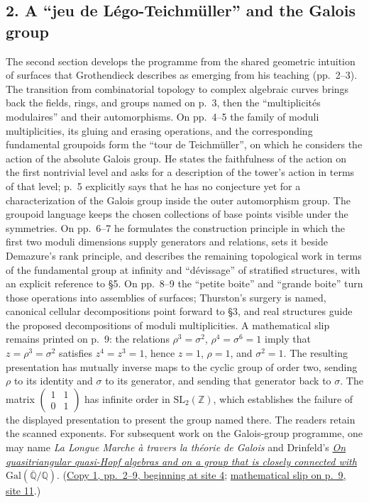 \documentclass[11pt,a4paper]{article}
\begin{document}
\subsection*{2. A ``jeu de Légo-Teichmüller'' and the Galois group}
The second section develops the programme from the shared geometric
intuition of surfaces that Grothendieck describes as emerging from his
teaching (pp.~2--3). The transition from combinatorial topology to complex
algebraic curves brings back the fields, rings, and groups named on p.~3,
then the ``multiplicités modulaires'' and their automorphisms. On
pp.~4--5 the family of moduli multiplicities, its gluing and erasing
operations, and the corresponding fundamental groupoids form the
``tour de Teichmüller'', on which he considers the action of the absolute
Galois group. He states the faithfulness of the action on the first
nontrivial level and asks for a description of the tower's action in terms
of that level; p.~5 explicitly says that he has no conjecture yet for a
characterization of the Galois group inside the outer automorphism group.
The groupoid language keeps the chosen collections of base points visible
under the symmetries. On pp.~6--7 he formulates the construction principle
in which the first two moduli dimensions supply generators and relations,
sets it beside Demazure's rank principle, and describes the remaining
topological work in terms of the fundamental group at infinity and
``dévissage'' of stratified structures, with an explicit reference to
\S5. On pp.~8--9 the ``petite boite'' and ``grande boite'' turn those
operations into assemblies of surfaces; Thurston's surgery is named,
canonical cellular decompositions point forward to \S3, and real
structures guide the proposed decompositions of moduli multiplicities.
A mathematical slip remains printed on p.~9: the relations
$\rho^3=\sigma^2$, $\rho^4=\sigma^6=1$ imply that
$z=\rho^3=\sigma^2$ satisfies $z^4=z^3=1$, hence $z=1$,
$\rho=1$, and $\sigma^2=1$. The resulting presentation has mutually
inverse maps to the cyclic group of order two, sending $\rho$ to its
identity and $\sigma$ to its generator, and sending that generator back
to $\sigma$. The matrix $\left(\begin{smallmatrix}1&1\\0&1\end{smallmatrix}\right)$
has infinite order in $\mathrm{SL}_2(\mathbb Z)$, which establishes the
failure of the displayed presentation to present the group named there.
The readers retain the scanned exponents. For subsequent work on the
Galois-group programme, one may name \emph{La Longue Marche à travers la
théorie de Galois} and Drinfeld's
\href{https://www.mathnet.ru/eng/aa199}{\emph{On quasitriangular quasi-Hopf algebras and on a group that is closely connected with}
$\mathrm{Gal}(\overline{\mathbb Q}/\mathbb Q)$}.
(\href{https://grothendieck.umontpellier.fr/web/viewer.html?file=../119.pdf\#page=5}{Copy 1, pp.~2--9, beginning at site 4};
\href{https://grothendieck.umontpellier.fr/web/viewer.html?file=../119.pdf\#page=12}{mathematical slip on p.~9, site 11}.)
\end{document}
